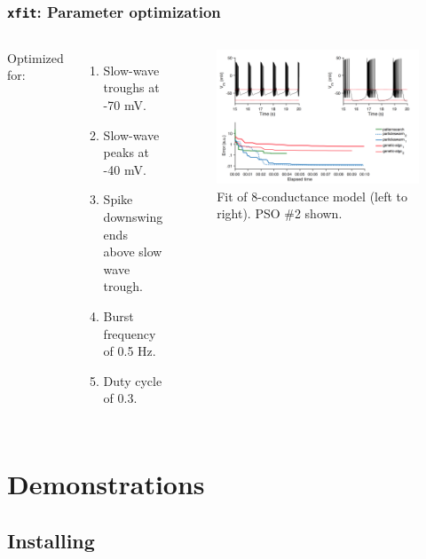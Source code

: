 \documentclass{beamer}
\begin{document}
\begin{frame}
  \frametitle{\texttt{xfit}: Parameter optimization}

  \begin{columns}
    Optimized for:

    \begin{enumerate}
      \item Slow-wave troughs at -70 mV.
      \item Slow-wave peaks at -40 mV.
      \item Spike downswing ends above slow wave trough.
      \item Burst frequency of 0.5 Hz.
      \item Duty cycle of 0.3.
    \end{enumerate}

    \begin{figure}
      \includegraphics[width=\textwidth]{gfx/xfit.png}
      \centering
      \caption{Fit of 8-conductance model (left to right). PSO \#2 shown.}
    \end{figure}
  \end{columns}

\end{frame}

\section{Demonstrations}

\subsection{Installing}
\end{document}
